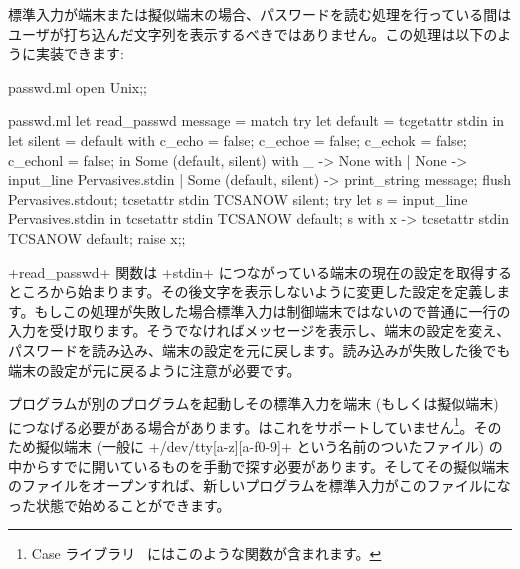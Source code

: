 \begin{example}
標準入力が端末または擬似端末の場合、パスワードを読む処理を行っている間はユーザが打ち込んだ文字列を表示するべきではありません。この処理は以下のように実装できます:
%
\begin{codefile}{passwd.ml}
open Unix;;
\end{codefile}
%
\begin{listingcodefile}{passwd.ml}
let read_passwd message =
  match
    try
      let default = tcgetattr stdin in
      let silent =
        { default with
          c_echo = false;
          c_echoe = false;
          c_echok = false;
          c_echonl = false;
        } in
      Some (default, silent)
    with _ -> None
  with
  | None -> input_line Pervasives.stdin
  | Some (default, silent) ->
      print_string message;
      flush Pervasives.stdout;
      tcsetattr stdin TCSANOW silent;
      try
        let s = input_line Pervasives.stdin in
        tcsetattr stdin TCSANOW default; s
      with x ->
        tcsetattr stdin TCSANOW default; raise x;;
\end{listingcodefile}
%
\ml+read_passwd+ 関数は \ml+stdin+ につながっている端末の現在の設定を取得するところから始まります。その後文字を表示しないように変更した設定を定義します。もしこの処理が失敗した場合標準入力は制御端末ではないので普通に一行の入力を受け取ります。そうでなければメッセージを表示し、端末の設定を変え、パスワードを読み込み、端末の設定を元に戻します。読み込みが失敗した後でも端末の設定が元に戻るように注意が必要です。
\end{example}

%
プログラムが別のプログラムを起動しその標準入力を端末 (もしくは擬似端末) につなげる必要がある場合があります。\ocaml はこれをサポートしていません\footnote{Case ライブラリ~\cite{Cash} にはこのような関数が含まれます。}。そのため擬似端末 (一般に \ml+/dev/tty[a-z][a-f0-9]+ という名前のついたファイル) の中からすでに開いているものを手動で探す必要があります。そしてその擬似端末のファイルをオープンすれば、新しいプログラムを標準入力がこのファイルになった状態で始めることができます。

